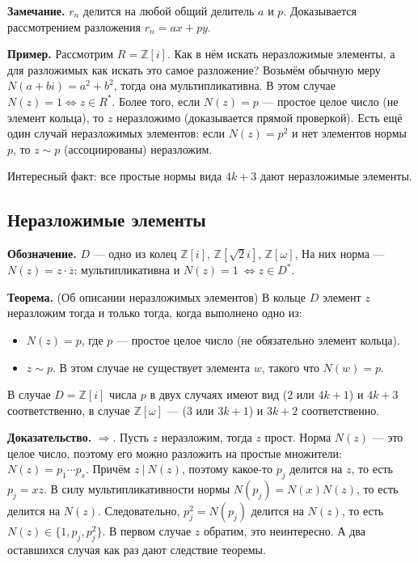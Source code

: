 \QED

\textbf{Замечание.} $r_n$ делится на любой общий делитель $a$ и $p$. Доказывается рассмотрением разложения $r_n = ax + py$.

\textbf{Пример.} Рассмотрим $R = \mathbb Z[i]$.
Как в нём искать неразложимые элементы, а для разложимых как искать это самое разложение?
Возьмём обычную меру $N(a + bi) = a^2 + b^2$, тогда она мультипликативна.
В этом случае $N(z) = 1 \iff z \in R^*$.
Более того, если $N(z) = p$ --- простое целое число (не элемент кольца), то $z$ неразложимо (доказывается прямой проверкой).
Есть ещё один случай неразложимых элементов: если $N(z) = p^2$ и нет элементов нормы $p$, то $z \sim p$ (ассоциированы) неразложим.

Интересный факт: все простые нормы вида $4k + 3$ дают неразложимые элементы.

\subsection{Неразложимые элементы}
\textbf{Обозначение.} $D$ --- одно из колец $\mathbb Z[i]$, $\mathbb Z[\sqrt 2 i]$, $\mathbb Z[\omega]$, 
На них норма --- $N(z) = z \cdot \overline z$: мультипликативна и $N(z) = 1\ \iff z \in D^*$.

\textbf{Теорема.} (Об описании неразложимых элементов) В кольце $D$ элемент $z$ неразложим тогда и только тогда, когда выполнено одно из:
\begin{itemize}
    \item $N(z) = p$, где $p$ --- простое целое число (не обязательно элемент кольца).
    \item $z \sim p$. В этом случае не существует элемента $w$, такого что $N(w) = p$.
\end{itemize}
В случае $D = \mathbb Z[i]$ числа $p$ в двух случаях имеют вид ($2$ или $4k + 1$) и $4k + 3$ соответственно, в случае $\mathbb Z[\omega]$ --- (3 или $3k + 1$) и $3k + 2$ соответственно.

\textbf{Доказательство.} $\Rightarrow$. Пусть $z$ неразложим, тогда $z$ прост.
Норма $N(z)$ --- это целое число, поэтому его можно разложить на простые множители: $N(z) = p_1 \cdots p_s$.
Причём $z~|~N(z)$, поэтому какое-то $p_j$ делится на $z$, то есть $p_j = xz$.
В силу мультипликативности нормы $N(p_j) = N(x) N(z)$, то есть делится на $N(z)$.
Следовательно, $p_j^2 = N(p_j)$ делится на $N(z)$, то есть $N(z) \in \{1, p_j, p_j^2\}$.
В первом случае $z$ обратим, это неинтересно.
А два оставшихся случая как раз дают следствие теоремы.


